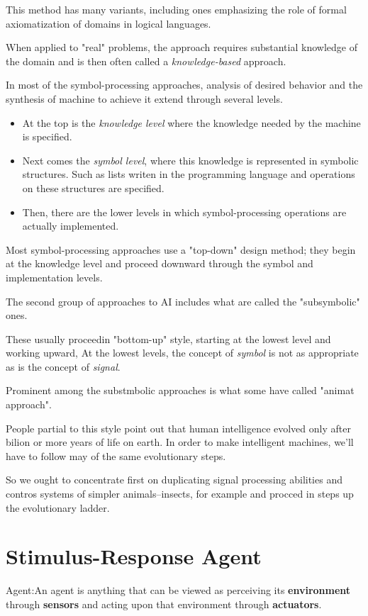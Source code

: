 This method has many variants, including ones emphasizing the role of formal axiomatization of domains in logical languages. 

When applied to "real" problems, the approach requires substantial knowledge of the domain and is then often called a \emph{knowledge-based} approach.

In most of the symbol-processing approaches, analysis of desired behavior and the synthesis of machine to achieve it extend through several levels. 

\begin{itemize}
\item At the top is the \emph{knowledge level} where the knowledge needed by the machine is specified.  
\item Next comes the \emph{symbol level}, where this knowledge is represented in symbolic structures. Such as lists writen in the programming language and operations on these structures are specified.
\item Then, there are the lower levels in which symbol-processing operations are actually implemented.
\end{itemize}

Most symbol-processing approaches use a "top-down" design method; they begin at the knowledge level and proceed downward through the symbol and implementation levels.

The second group of approaches to AI includes what are called the "subsymbolic" ones.

These usually proceedin "bottom-up" style, starting at the lowest level and working upward, At the lowest levels, the concept of \emph{symbol} is not as appropriate as is the concept of \emph{signal}.

Prominent among the substmbolic approaches is what some have called "animat approach".

People partial to this style point out that human intelligence evolved only after bilion or more years of life on earth. In order to make intelligent machines, we'll have to follow may of the same evolutionary steps.

So we ought to concentrate first on duplicating signal processing abilities and contros systems of simpler animals--insects, for example and procced in steps up the evolutionary ladder.



\chapter{Stimulus-Response Agent}
Agent:An agent is anything that can be viewed as perceiving its
\textbf{environment} through \textbf{sensors} and acting upon that environment
through \textbf{actuators}. 

